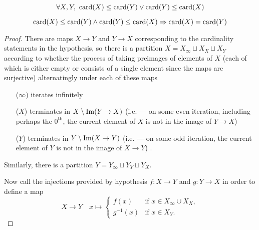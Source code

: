 \begin{prop}\label{prop:0.7}
  \[
  \forall X,Y,\
  \operatorname{card}(X)\leq\operatorname{card}(Y) \lor \operatorname{card}(Y)\leq\operatorname{card}(X)
  \]
\end{prop}


\begin{thm}\label{thm:0.8}\label{thm:schroder-bernstein}
  \[
  \operatorname{card}(X)\leq\operatorname{card}(Y) \land \operatorname{card}(Y)\leq\operatorname{card}(X) \Rightarrow
  \operatorname{card}(X)=\operatorname{card}(Y)
  \]
\end{thm}
\begin{proof}
  There are maps ${X\rightarrow Y}$ and ${Y\rightarrow X}$
  corresponding to the cardinality statements in the hypothesis,
  so there is a partition
  ${X = X_\infty \sqcup X_X \sqcup X_Y}$
  according to whether the process of taking preimages
  of elements of $X$
  (each of which is either empty or consists of a single element
  since the maps are surjective)
  alternatingly under each of these maps
  \begin{itemize}
  \item[($\infty$)] iterates infinitely
  \item[($X$)] terminates in ${X\setminus\operatorname{Im}(Y\rightarrow X)}$
    (i.e. --- on some even iteration,
    including perhaps the $0^{\text{th}}$,
    the current element of $X$ is not in the image of ${Y\rightarrow X}$)
  \item[($Y$)] terminates in ${Y\setminus\operatorname{Im}(X\rightarrow Y)}$
    (i.e. --- on some odd iteration,
    the current element of $Y$ is not in the image of ${X\rightarrow Y}$)
    .
  \end{itemize}
  Similarly, there is a partition
  ${Y = Y_\infty \sqcup Y_Y \sqcup Y_X}$.

  Now call the injections provided by hypothesis
  ${f: X\rightarrow Y}$ and ${g: Y\rightarrow X}$
  in order to define a map
  \begin{equation*}
    X \rightarrow Y \quad x\mapsto\left\{
    \begin{array}{rl}
      f(x) & \text{if } x\in X_\infty\cup X_X,\\
      g^{-1}(x) & \text{if } x\in X_Y.
    \end{array}
    \right.
  \end{equation*}
\end{proof}

